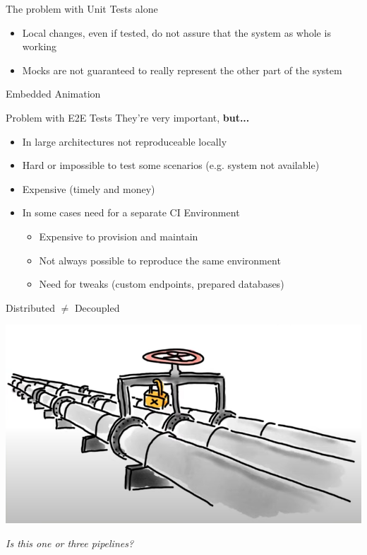 \begin{frame}{The problem with Unit Tests alone}
  \begin{itemize}
    \item Local changes, even if tested, do not assure that the system as whole is working
    \item Mocks are not guaranteed to really represent the other part of the system
  \end{itemize}
\end{frame}

\begin{frame}{Embedded Animation}
  \begin{center}
  \end{center}
\end{frame}

\begin{frame}{Problem with E2E Tests}
  They're very important, \textbf{but...}
  \begin{itemize}
    \item In large architectures not reproduceable locally
    \item Hard or impossible to test some scenarios (e.g. system not available)
    \item Expensive (timely and money)
    \item In some cases need for a separate CI Environment
    \begin{itemize}
      \item Expensive to provision and maintain
      \item Not always possible to reproduce the same environment
      \item Need for tweaks (custom endpoints, prepared databases)
    \end{itemize}
  \end{itemize}
\end{frame}

\begin{frame}{Distributed $\ne$ Decoupled}
  \begin{center}
    \includegraphics[scale=.43]{./assets/coupling.png}

    \textit{Is this one or three pipelines?}
  \end{center}
\end{frame}


